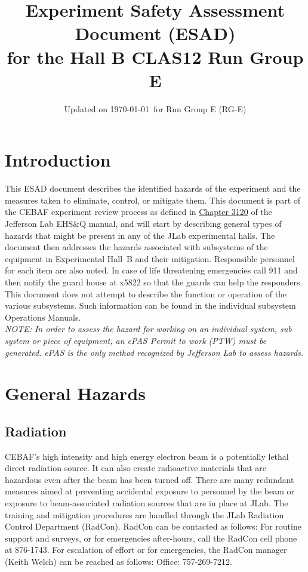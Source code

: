\documentclass[12pt]{report}
\begin{document}
\title{Experiment Safety Assessment Document (ESAD) \\ 
for the Hall B CLAS12 Run Group E}
\date{Updated on \today\ for Run Group E (RG-E)}
%
%
%
\maketitle
\tableofcontents

\chapter{Introduction}

This ESAD document describes the identified hazards of the experiment and the measures 
taken to eliminate, control, or mitigate them. This document is part of the CEBAF 
experiment review process as defined in
\href{http://www.jlab.org/ehs/ehsmanual/manual/3120.html}{Chapter 3120} of the Jefferson 
Lab EHS\&Q manual, and will start by describing general types of hazards that might be 
present in any of the JLab experimental halls.  The document then addresses the hazards 
associated with subsystems of the equipment in Experimental Hall~B and their mitigation.  
Responsible personnel for each item are also noted. In case of life threatening emergencies 
call 911 and then notify the guard house at x5822 so that the guards can help the 
responders.  This document does not attempt to describe the function or operation of the 
various subsystems. Such information can be found in the individual subsystem Operations 
Manuals.
\vspace{1cm}\\
{\em NOTE:  In order to assess the hazard for working on an individual system, sub system or
piece of equipment, an ePAS Permit to work (PTW) must be generated. ePAS is the only method
recognized by Jefferson Lab to assess hazards.}

\chapter{General Hazards}

\section{Radiation}
	
CEBAF's high intensity and high energy electron beam is a potentially lethal direct 
radiation source. It can also create radioactive materials that are hazardous even after 
the beam has been turned off. There are many redundant measures aimed at preventing 
accidental exposure to personnel by the beam or exposure to beam-associated radiation 
sources that are in place at JLab. The training and mitigation procedures are handled 
through the JLab Radiation Control Department (RadCon). RadCon can be contacted as follows: 
For routine support and surveys, or for emergencies after-hours, call the RadCon cell phone 
at 876-1743. For escalation of effort or for emergencies, the RadCon manager (Keith Welch) 
can be reached as follows: Office: 757-269-7212.
\end{document}
